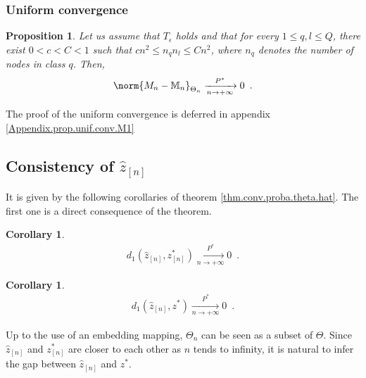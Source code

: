 \documentclass[11pt]{article}
\newtheorem{prop}[thm]{Proposition}
\newtheorem{cor}[thm]{Corollary}
\newcommand{\zn}{z_{[n]}}
\newcommand{\znh}{\widehat{z}_{[n]}}
\begin{document}
\subsubsection{Uniform convergence}


\begin{prop}\label{prop.unif.conv.cond.model}
Let us assume that $T_{\epsilon}$ holds and that for every $1\leq q,l\leq Q$, there exist $0< c < C <1$ such that
$ c n^2\leq n_q n_l \leq C n^2$, where $n_q$ denotes the number of nodes in class $q$.
Then,
\begin{align*}          \norm{M_n-\mathbb{M}_n}_{\Theta_n}\xrightarrow[n\to +\infty]{P^*}0\enspace.
\end{align*}
\end{prop}

The proof of the uniform convergence is deferred in appendix \ref{Appendix.prop.unif.conv.M1}

\subsection{Consistency of $\znh$}
It is given by the following corollaries of theorem \ref{thm.conv.proba.theta.hat}. The first one is a direct consequence of the theorem.
\begin{cor}\label{cor.dist.znh.znstar}
        \begin{align*}
        d_1(\znh,\zn^*)\xrightarrow[n\to+\infty]{P^*}0\enspace.
        \end{align*}
\end{cor}




\begin{cor}\label{cor.conv.dist.znh.zstar}
        \begin{align*}
        d_1(\znh,z^*)\xrightarrow[n\to+\infty]{P^*}0\enspace.
        \end{align*}
\end{cor}
Up to the use of an embedding mapping, $\Theta_n$ can be seen as a subset of $\Theta$.
%
Since $\znh$ and $\zn^*$ are closer to each other as $n$ tends to infinity, it is natural to infer the gap between $\znh$ and $z^*$.
\end{document}
